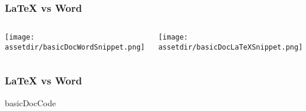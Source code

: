 \documentclass[../presentatie.tex]{subfiles}
\def\named#1{}
\begin{document}
    \clearrecentlist

    \named{intro-wordcomp-doc}
    \begin{frame}
        \frametitle{\LaTeX{} vs Word}

        \begin{columns}
            \begin{column}{0.5\textwidth}
                \texttt{[image: \\assetdir/basicDocWordSnippet.png]}
            \end{column}
            \begin{column}{0.5\textwidth}
                \texttt{[image: \\assetdir/basicDocLaTeXSnippet.png]}
            \end{column}
        \end{columns}
    \end{frame}

    \named{intro-wordcomp-doc-eqfragment}
    \begin{frame}
        \frametitle{\LaTeX{} vs Word}

        \bgroup
        \setlength{\fboxsep}{0pt}
        \medskip

        \egroup
    \end{frame}

    \let\frameselection\somethingundefined

    \named{intro-wordcomp-ondermotorkap}
    \ifx\frameselection\somethingundefined
        \def\frameselection{1-2}
    \fi

    \begin{saveblock}{basicDocCode}
    \end{saveblock}
\end{document}
